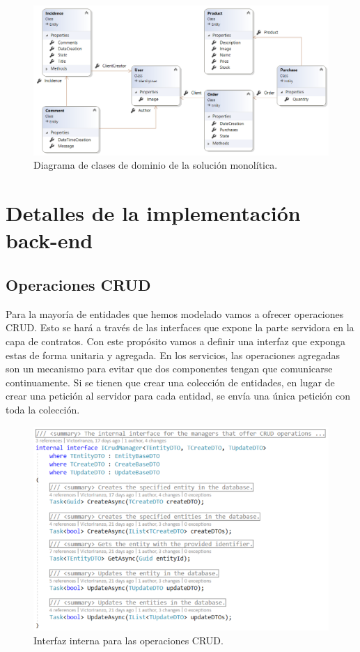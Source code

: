 \documentclass[11pt,spanish,listoffigures]{tfgetsinf}
\begin{document}
\begin{figure}[h]
\centering
\includegraphics[scale=0.65]{ClassDiagram}
\caption{Diagrama de clases de dominio de la solución monolítica.}
\end{figure}

\newpage

\section{Detalles de la implementación back-end}

\subsection{Operaciones CRUD} \label{subsect:CRUD}

Para la mayoría de entidades que hemos modelado vamos a ofrecer operaciones CRUD. Esto se hará a través de las interfaces que expone la parte servidora en la capa de contratos. Con este propósito vamos a definir una interfaz que exponga estas de forma unitaria y agregada. En los servicios, las operaciones agregadas son un mecanismo para evitar que dos componentes tengan que comunicarse continuamente. Si se tienen que crear una colección de entidades, en lugar de crear una petición al servidor para cada entidad, se envía una única petición con toda la colección\cite{Newman2015a}.

\begin{figure}[h]
\centering
\includegraphics[scale=0.8]{ICrudManager}
\caption{Interfaz interna para las operaciones CRUD.}
\end{figure}
\end{document}
